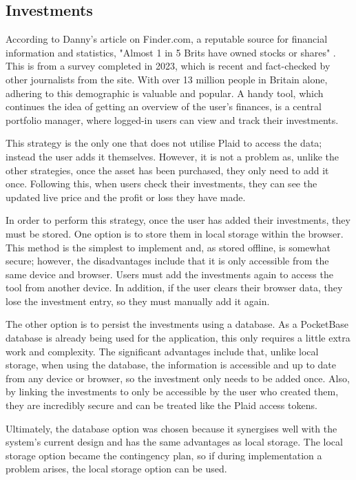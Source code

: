\subsection{Investments}
According to Danny's article on Finder.com, a reputable source for financial information and statistics, "Almost 1 in 5 Brits have owned stocks or shares" \cite{InvestmentStats}. This is from a survey completed in 2023, which is recent and fact-checked by other journalists from the site. With over 13 million people in Britain alone, adhering to this demographic is valuable and popular. A handy tool, which continues the idea of getting an overview of the user's finances, is a central portfolio manager, where logged-in users can view and track their investments.

This strategy is the only one that does not utilise Plaid to access the data; instead the user adds it themselves. However, it is not a problem as, unlike the other strategies, once the asset has been purchased, they only need to add it once. Following this, when users check their investments, they can see the updated live price and the profit or loss they have made.

In order to perform this strategy, once the user has added their investments, they must be stored. One option is to store them in local storage within the browser. This method is the simplest to implement and, as stored offline, is somewhat secure; however, the disadvantages include that it is only accessible from the same device and browser. Users must add the investments again to access the tool from another device. In addition, if the user clears their browser data, they lose the investment entry, so they must manually add it again.

The other option is to persist the investments using a database. As a PocketBase database is already being used for the application, this only requires a little extra work and complexity. The significant advantages include that, unlike local storage, when using the database, the information is accessible and up to date from any device or browser, so the investment only needs to be added once. Also, by linking the investments to only be accessible by the user who created them, they are incredibly secure and can be treated like the Plaid access tokens.

Ultimately, the database option was chosen because it synergises well with the system's current design and has the same advantages as local storage. The local storage option became the contingency plan, so if during implementation a problem arises, the local storage option can be used.

